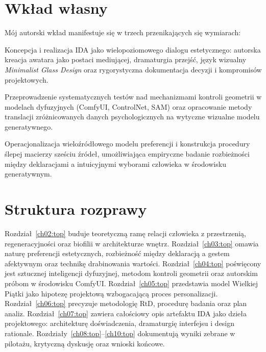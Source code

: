 \section{Wkład własny}
\label{ch01:sec:wklad}

Mój autorski wkład manifestuje się w trzech przenikających się wymiarach:

\begin{description}[style=nextline]
  \item[Wymiar projektowy]
  Koncepcja i realizacja IDA jako wielopoziomowego dialogu estetycznego: autorska kreacja awatara jako postaci mediującej, dramaturgia przejść, język wizualny \emph{Minimalist Glass Design} oraz rygorystyczna dokumentacja decyzji i kompromisów projektowych.

  \item[Wymiar techniczno-medialny]
  Przeprowadzenie systematycznych testów nad mechanizmami kontroli geometrii w modelach dyfuzyjnych (ComfyUI, ControlNet, SAM) oraz opracowanie metody translacji zróżnicowanych danych psychologicznych na wytyczne wizualne modelu generatywnego.

  \item[Wymiar badawczy]
  Operacjonalizacja wieloźródłowego modelu preferencji i konstrukcja procedury ślepej macierzy sześciu źródeł, umożliwiająca empiryczne badanie rozbieżności między deklaracjami a intuicyjnymi wyborami człowieka w środowisku generatywnym.
\end{description}

\section{Struktura rozprawy}
\label{ch01:sec:struktura}

Rozdział~\ref{ch02:top} buduje teoretyczną ramę relacji człowieka z przestrzenią, regeneracyjności oraz biofilii w architekturze wnętrz.
Rozdział~\ref{ch03:top} omawia naturę preferencji estetycznych, rozbieżność między deklaracją a gestem afektywnym oraz technikę drabinowania wartości.
Rozdział~\ref{ch04:top} poświęcony jest sztucznej inteligencji dyfuzyjnej, metodom kontroli geometrii oraz autorskim próbom w środowisku ComfyUI.
Rozdział~\ref{ch05:top} przedstawia model Wielkiej Piątki jako hipotezę projektową wzbogacającą proces personalizacji.
Rozdział~\ref{ch06:top} precyzuje metodologię RtD, procedurę badania oraz plan analiz.
Rozdział~\ref{ch07:top} zawiera całościowy opis artefaktu IDA jako dzieła projektowego: architekturę doświadczenia, dramaturgię interfejsu i design rationale.
Rozdziały~\ref{ch08:top}--\ref{ch10:top} dokumentują wyniki zebrane w pilotażu, krytyczną dyskusję oraz wnioski końcowe.
